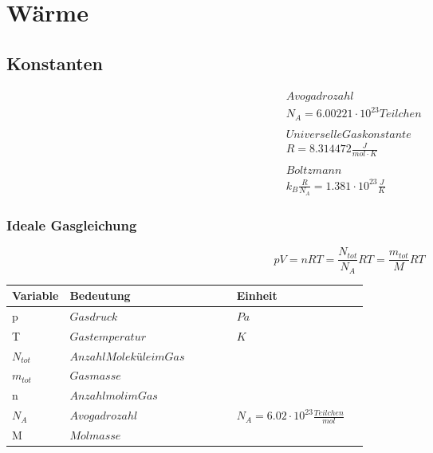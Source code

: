 



\chapter{W\"arme}

\section{Konstanten}
\[
\boxed{\begin{aligned}	
		&Avogadrozahl \\
		&N_{A} = 6.00221 \cdot 10^{23} Teilchen\\
		\\
		&Universelle Gaskonstante\\
		&R = 8.314472 \frac{J}{mol \cdot K}\\
		\\
		&Boltzmann\\
		&k_{B} \frac{R}{N_{A}}=1.381 \cdot 10^{23} \frac{J}{K}
	\end{aligned}}	\]

\subsection{Ideale Gasgleichung}

\[pV = nRT = \frac{N_{tot}}{N_{A}}RT = \frac{m_{tot}}{M}RT\]

\begin{tabular*}{\linewidth}{p{0.15\linewidth}lp{0.37\linewidth}}
	\textbf{Variable}				&	\textbf{Bedeutung}		& \textbf{Einheit}\\
	\hline
	\rowcolor{white}p			&      $Gasdruck$				&$Pa$\\
	\rowcolor{lgray}T			&	$Gastemperatur$			& $K$\\
	\rowcolor{white}$N_{tot}$		&	$Anzahl Moleküle im Gas$	&$ $\\				
	\rowcolor{lgray}$m_{tot}$		&	$Gasmasse$			&$ $\\
	\rowcolor{white}n			&	$Anzahl mol im Gas$		&$ $\\
	\rowcolor{lgray}$N_{A}$		&	$Avogadrozahl$			&$N_{A} = 6.02 \cdot 10^23 \frac{Teilchen}{mol}$\\	
	\rowcolor{white}M			&	$Molmasse$			&$ $\\
\end{tabular*}


